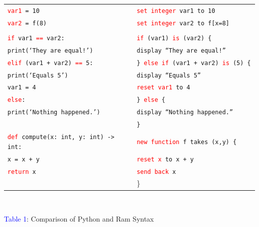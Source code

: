 \documentclass[fontsize=11pt]{article}
\newcommand{\red}[1]{\textcolor{red}{#1}}
\begin{document}
\begin{center}
\begin{spacing}{1.1}
\begin{tabular}{|l|l|}
             \hline
             
             \texttt{\red{var1} = 10} & \texttt{\red{set integer} var1 to 10} \\ 
             \texttt{\red{var2} = f(8) } &               \texttt{\red{set integer} var2 to f[x=8]} \\
             
             \quad \quad & \quad \quad \\
             
             \texttt{\red{if} var1 \red{==} var2:} & \texttt{\red{if} (var1) \red{is} (var2) \{ } \\
             
             \quad \quad \texttt{print(`They are equal!')} & \quad \quad \texttt{display ``They are equal!''} \\
             
             \texttt{\red{elif} (var1 + var2) \red{==} 5:} & \texttt{\} \red{else if} (var1 + var2) \red{is} (5) \{ } \\
             
             \quad \quad \texttt{print(`Equals 5')} & \quad \quad \texttt{display ``Equals 5''} \\

             \quad \quad \texttt{var1 = 4} & \quad \quad \texttt{\red{reset var1} to 4} \\
             
             \texttt{\red{else}: } & \texttt{\} \red{else} \{} \\
             
             \quad \quad \texttt{print(`Nothing happened.')} & \quad \quad \texttt{display ``Nothing happened.''} \\
              
             \quad \quad & \texttt{\}} \\
             
             \hline 
             
             \texttt{\red{def} compute(x:\,int, y:\,int) -> int:} & \texttt{\red{new function} f takes (x,y) \{ } \\
             \quad \quad \texttt{x = x + y} & \quad \quad \texttt{\red{reset x} to x + y} \\
             \quad \quad \texttt{\red{return} x} & \quad \quad \texttt{\red{send back} x} \\
              & \} \\
              
             \hline
        \end{tabular}
    
    \end{spacing}
    
    $ $
    
    \small{\textcolor{blue}{Table 1}: Comparison of Python and Ram Syntax}
    
\end{center}
\end{document}
